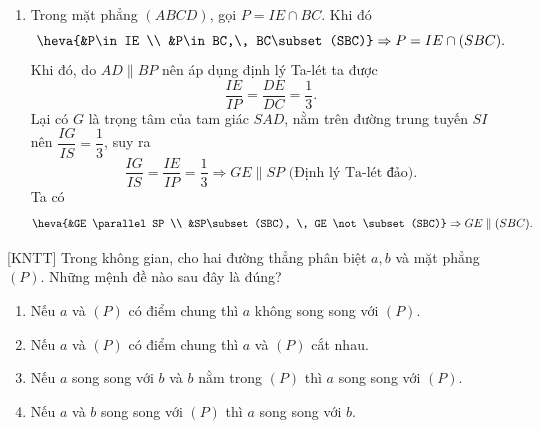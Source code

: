 \begin{bt}
{\begin{enumerate}
			\item Trong mặt phẳng $(ABCD)$, gọi $P = IE\cap BC$. Khi đó\\
			$$\heva{&P\in IE \\ &P\in BC,\, BC\subset (SBC)} \Rightarrow P = IE \cap (SBC).$$ 
			Khi đó, do $AD \parallel BP$ nên áp dụng định lý Ta-lét ta được $$\dfrac{IE}{IP} = \dfrac{DE}{DC} = \dfrac{1}{3}.$$ 
			Lại có $G$ là trọng tâm của tam giác $SAD$, nằm trên đường trung tuyến $SI$ nên $\dfrac{IG}{IS} = \dfrac{1}{3}$, suy ra
			$$\dfrac{IG}{IS} = \dfrac{IE}{IP}=\dfrac{1}{3} \Rightarrow GE \parallel SP \text{ (Định lý Ta-lét đảo).}$$
			Ta có $$ \heva{&GE \parallel SP \\ &SP\subset (SBC), \, GE \not\subset (SBC)} \Rightarrow GE \parallel (SBC).$$
		\end{enumerate}
	}
\end{bt}

\begin{bt}%
	[KNTT]
	Trong không gian, cho hai đường thẳng phân biệt $a, b$ và mặt phẳng $(P)$. Những mệnh đề nào sau đây là đúng?
	\begin{enumerate} 
		\item[a)] Nếu $ a $ và $(P)$ có điểm chung thì $ a $ không song song với $(P)$.
		\item[b)] Nếu $ a $ và $(P)$ có điểm chung thì $ a $ và $(P)$ cắt nhau.
		\item[c)] Nếu $ a $ song song với $ b$ và $ b$ nằm trong $(P)$ thì $ a $ song song với $(P)$.
		\item[d)] Nếu $ a$ và $ b$ song song với $(P)$ thì $ a $ song song với $ b$.
	\end{enumerate}
\end{bt}

